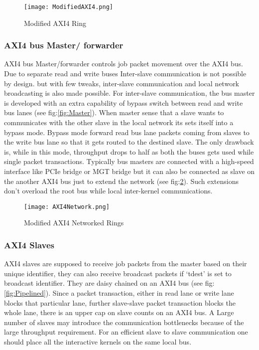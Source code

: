 \documentclass[10pt, conference, compsocconf]{IEEEtran}
\begin{document}
\begin{figure}[!htbp]
  \begin{center}
    \texttt{[image: ModifiedAXI4.png]}
    \caption{Modified AXI4 Ring}
    \label{fig:ModifiedAXI4}
  \end{center}
\end{figure}


\subsubsection{AXI4 bus Master/ forwarder}
AXI4 bus Master/forwarder controls job packet movement over the AXI4 bus. Due to separate read and write buses Inter-slave communication is not possible by design. but with few tweaks, inter-slave communication and local network broadcasting is also made possible. For inter-slave communication, the bus master is developed with an extra capability of bypass switch between read and write bus lanes (see fig:\ref{fig:Master}). When master sense that a slave wants to communicates with the other slave in the local network its sets itself into a bypass mode. Bypass mode forward read bus lane packets coming from slaves to the write bus lane so that it gets routed to the destined slave. The only drawback is, while in this mode, throughput drops to half as both the buses gets used while single packet transactions. Typically bus masters are connected with a high-speed interface like PCIe bridge or MGT bridge but it can also be connected as slave on the another AXI4 bus just to extend the network (see fig:\ref{fig:AXI4Network}). Such extensions don't overload the root bus while local inter-kernel communications. 

\begin{figure}[!htbp]
  \begin{center}
    \texttt{[image: AXI4Network.png]}
    \caption{Modified AXI4 Networked Rings}
    \label{fig:AXI4Network}
  \end{center}
\end{figure}

\subsubsection{AXI4 Slaves}
AXI4 slaves are supposed to receive job packets from the master based on their unique identifier, they can also receive broadcast packets if `tdest' is set to broadcast identifier. They are daisy chained on an AXI4 bus (see fig:\ref{fig:Pipelined}). Since a packet transaction, either in read lane or write lane blocks that particular lane, further slave-slave packet transaction blocks the whole lane, there is an upper cap on slave counts on an AXI4 bus. A Large number of slaves may introduce the communication bottlenecks because of the large throughput requirement. For an efficient slave to slave communication one should place all the interactive kernels on the same local bus.
\end{document}

